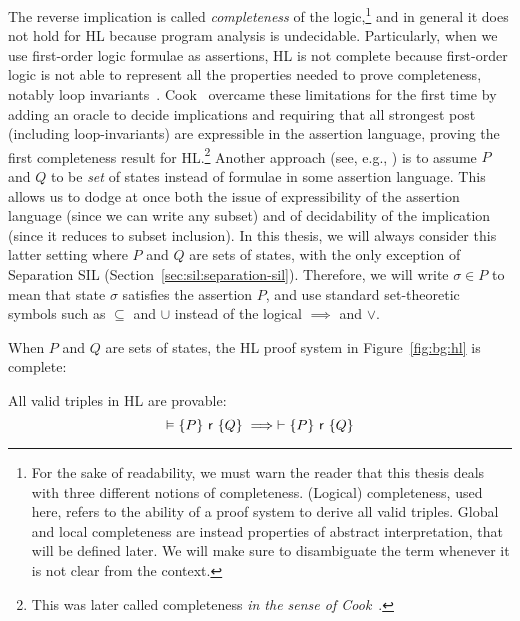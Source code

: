 The reverse implication is called \emph{completeness} of the logic,\footnote{For the sake of readability, we must warn the reader that this thesis deals with three different notions of completeness. (Logical) completeness, used here, refers to the ability of a proof system to derive all valid triples. Global and local completeness are instead properties of abstract interpretation, that will be defined later. We will make sure to disambiguate the term whenever it is not clear from the context.} and in general it does not hold for HL because program analysis is undecidable. Particularly, when we use first-order logic formulae as assertions, HL is not complete because first-order logic is not able to represent all the properties needed to prove completeness, notably loop invariants~\cite[§2.7]{Apt81}.
Cook~\cite{Cook78} overcame these limitations for the first time by adding an oracle to decide implications and requiring that all strongest post (including loop-invariants) are expressible in the assertion language, proving the first completeness result for HL.\footnote{This was later called completeness \emph{in the sense of Cook}~\cite[§2.8]{Apt81}.}
Another approach (see, e.g., \cite{CCLB12,OHearn20}) is to assume $P$ and $Q$ to be \emph{set} of states instead of formulae in some assertion language. This allows us to dodge at once both the issue of expressibility of the assertion language (since we can write any subset) and of decidability of the implication (since it reduces to subset inclusion).
In this thesis, we will always consider this latter setting where $P$ and $Q$ are sets of states, with the only exception of Separation SIL (Section~\ref{sec:sil:separation-sil}). Therefore, we will write $\sigma \in P$ to mean that state $\sigma$ satisfies the assertion $P$, and use standard set-theoretic symbols such as $\subseteq$ and $\cup$ instead of the logical $\implies$ and $\lor$.

When $P$ and $Q$ are sets of states, the HL proof system in Figure~\ref{fig:bg:hl} is complete:

\begin{theorem}
	All valid triples in HL are provable:
	\[
	\vDash \{P\}~\mathsf{r}~\{Q\} \implies \vdash \{P\}~\mathsf{r}~\{Q\}
	\]
\end{theorem}

